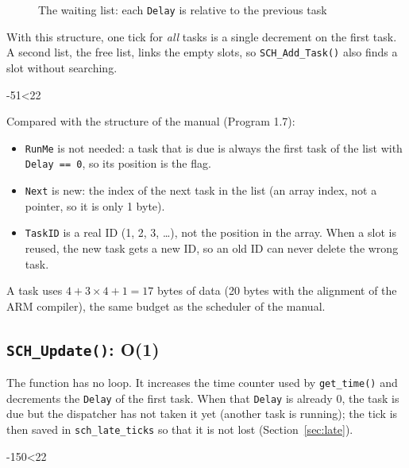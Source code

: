 \documentclass[12pt,a4paper]{article}
\numberwithin{figure}{section}
\numberwithin{table}{section}
\newcommand{\srcbody}[4]{}
\newcommand{\src}[4]{\par\ifnum\numexpr#3-#2\relax<22 \noindent\begin{minipage}{\linewidth}\srcbody{#1}{#2}{#3}{#4}\end{minipage}\else\srcbody{#1}{#2}{#3}{#4}\fi\par}
\newcommand{\code}[1]{\texttt{#1}}
\begin{document}
\begin{figure}[H]
\centering
{}
\caption{The waiting list: each \code{Delay} is relative to the previous task}
\label{fig:delta}
\end{figure}

With this structure, one tick for \emph{all} tasks is a single decrement on the first task. A second list, the free list, links the empty slots, so \code{SCH\_Add\_Task()} also finds a slot without searching.

\src{scheduler.c}{51}{68}{The task structure and the scheduler variables}

Compared with the structure of the manual (Program 1.7):
\begin{itemize}[leftmargin=1.4em,itemsep=1pt]
\item \code{RunMe} is not needed: a task that is due is always the first task of the list with \code{Delay == 0}, so its position is the flag.
\item \code{Next} is new: the index of the next task in the list (an array index, not a pointer, so it is only 1 byte).
\item \code{TaskID} is a real ID (1, 2, 3, \ldots), not the position in the array. When a slot is reused, the new task gets a new ID, so an old ID can never delete the wrong task.
\end{itemize}
A task uses $4 + 3\times4 + 1 = 17$ bytes of data (20 bytes with the alignment of the ARM compiler), the same budget as the scheduler of the manual.

\subsection{\code{SCH\_Update()}: O(1)}
\label{sec:update}
The function has no loop. It increases the time counter used by \code{get\_time()} and decrements the \code{Delay} of the first task. When that \code{Delay} is already 0, the task is due but the dispatcher has not taken it yet (another task is running); the tick is then saved in \code{sch\_late\_ticks} so that it is not lost (Section~\ref{sec:late}).
\src{scheduler.c}{150}{161}{\code{SCH\_Update()}}
\end{document}
